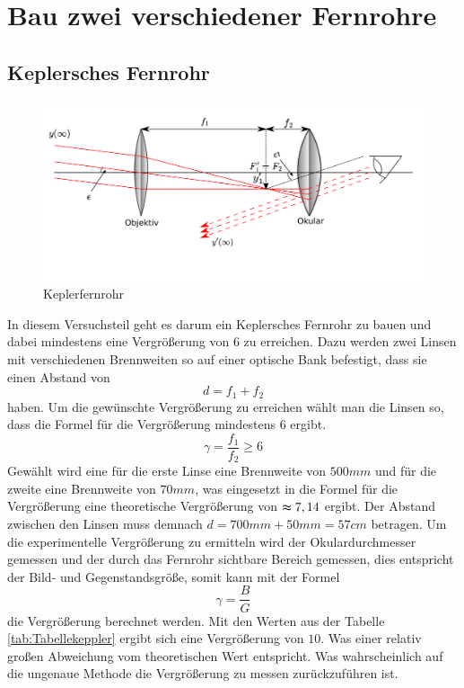 \section{Bau zwei verschiedener Fernrohre}
\subsection{Keplersches Fernrohr}

\begin{figure}[h!]
    \centering
    \includegraphics[scale=0.8]{Geometrische_Optik/Protokoll/fig/Keplerfernrohr.png}
    \caption{Keplerfernrohr}
    \label{fig:Keplerfernrohr}
\end{figure}

In diesem Versuchsteil geht es darum ein Keplersches Fernrohr zu bauen und dabei mindestens eine Vergrößerung von 6 zu erreichen. Dazu werden zwei Linsen mit verschiedenen Brennweiten so auf einer optische Bank befestigt, dass sie einen Abstand von $$ d = f_1 + f_2 $$ haben. Um die gewünschte Vergrößerung zu erreichen wählt man die Linsen so, dass die Formel für die Vergrößerung mindestens 6 ergibt. $$  \gamma = \frac{f_1}{f_2} \geqslant 6$$Gewählt wird eine für die erste Linse eine Brennweite von $500mm$ und für die zweite eine Brennweite von $70mm$, was eingesetzt in die Formel für die Vergrößerung eine theoretische Vergrößerung von $\thickapprox 7,14 $ ergibt. Der Abstand zwischen den Linsen muss demnach $d = 700mm + 50mm = 57cm$ betragen.
Um die experimentelle Vergrößerung zu ermitteln wird der Okulardurchmesser gemessen und der durch das Fernrohr sichtbare Bereich gemessen, dies entspricht der Bild- und Gegenstandsgröße, somit kann mit der Formel $$ \gamma = \frac{B}{G} $$ die Vergrößerung berechnet werden. Mit den Werten aus der Tabelle \ref{tab:Tabellekeppler} ergibt sich eine Vergrößerung von $10$. Was einer relativ großen Abweichung vom theoretischen Wert entspricht. Was wahrscheinlich auf die ungenaue Methode die Vergrößerung zu messen zurückzuführen ist.

